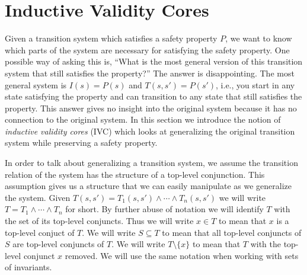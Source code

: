 \section{Inductive Validity Cores}
\label{sec:ivc}

\newcommand{\bfalg}{IVC\_BF\xspace}
\newcommand{\ucalg}{IVC\_UC\xspace}
\newcommand{\ucbfalg}{IVC\_UCBF\xspace}
\newcommand{\bq}{\textsc{BaseQuery}\xspace}
\newcommand{\iq}{\textsc{IndQuery}\xspace}
\newcommand{\fq}{\textsc{FullQuery}\xspace}

\newcommand{\mink}{\textsc{MinimizeK}\xspace}
\newcommand{\reduceinv}{\textsc{ReduceInvariants}\xspace}
\newcommand{\minivc}{\textsc{MinimizeIvc}\xspace}

\newcommand{\checksat}{\textsc{CheckSat}\xspace}
\newcommand{\unsatcore}{\textsc{UnsatCore}\xspace}
\newcommand{\unsat}{\textsc{UNSAT}\xspace}
\newcommand{\sat}{\textsc{SAT}\xspace}

Given a transition system which satisfies a safety property $P$, we
want to know which parts of the system are necessary for satisfying
the safety property. One possible way of asking this is, ``What is the
most general version of this transition system that still satisfies
the property?'' The answer is disappointing. The most general system is
$I(s) = P(s)$ and $T(s, s') = P(s')$, i.e., you start in any state
satisfying the property and can transition to any state that still
satisfies the property. This answer gives no insight into the original
system because it has no connection to the original system. In this
section we introduce the notion of {\em inductive validity cores} (IVC)
which looks at generalizing the original transition system while
preserving a safety property.

In order to talk about generalizing a transition system, we assume the
transition relation of the system has the structure of a top-level
conjunction. This assumption gives us a structure that we can easily
manipulate as we generalize the system. Given $T(s, s') = T_1(s, s')
\land \cdots \land T_n(s, s')$ we will write $T = T_1 \land \cdots
\land T_n$ for short. By further abuse of notation we will identify
$T$ with the set of its top-level conjuncts. Thus we will write $x \in
T$ to mean that $x$ is a top-level conjuct of $T$. We will write $S
\subseteq T$ to mean that all top-level conjuncts of $S$ are top-level
conjuncts of $T$. We will write $T \setminus \{x\}$ to mean that $T$
with the top-level conjunct $x$ removed. We will use the same notation
when working with sets of invariants.

